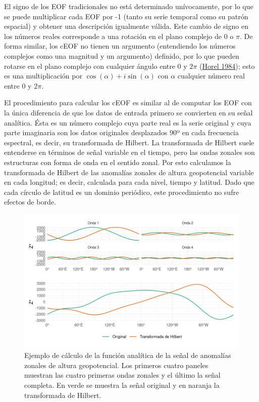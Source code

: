 \documentclass[12pt,oneside,a4paper]{reedthesis}
\begin{document}
El signo de los EOF tradicionales no está determinado unívocamente, por lo que se puede multiplicar cada EOF por -1 (tanto su serie temporal como su patrón espacial) y obtener una descripción igualmente válida.
Este cambio de signo en los números reales corresponde a una rotación en el plano complejo de 0 o \(\pi\).
De forma similar, los cEOF no tienen un argumento (entendiendo los números complejos como una magnitud y un argumento) definido, por lo que pueden rotarse en el plano complejo con cualquier ángulo entre 0 y \(2\pi\) (\protect\hyperlink{ref-horel1984}{Horel 1984}); esto es una multiplicación por \(\cos(\alpha) + i\sin(\alpha)\) con \(\alpha\) cualquier número real entre 0 y \(2\pi\).

El procedimiento para calcular los cEOF es similar al de computar los EOF con la única diferencia de que los datos de entrada primero se convierten en su señal analítica.
Ésta es un número complejo cuya parte real es la serie original y cuya parte imaginaria son los datos originales desplazados 90º en cada frecuencia espectral, es decir, su transformada de Hilbert.
La transformada de Hilbert suele entenderse en términos de señal variable en el tiempo, pero las ondas zonales son estructuras con forma de onda en el sentido zonal.
Por esto calculamos la transformada de Hilbert de las anomalías zonales de altura geopotencial variable en cada longitud; es decir, calculada para cada nivel, tiempo y latitud.
Dado que cada círculo de latitud es un dominio periódico, este procedimiento no sufre efectos de borde.



\begin{figure}

{\centering \includegraphics{figures/20-ceofs/hilbert-ejemplo-1} 

}

\caption{Ejemplo de cálculo de la función analítica de la señal de anomalías zonales de altura geopotencial. Los primeros cuatro paneles muestran las cuatro primeras ondas zonales y el último la señal completa. En verde se muestra la señal original y en naranja la transformada de Hilbert.}\label{fig:hilbert-ejemplo}
\end{figure}
\end{document}
